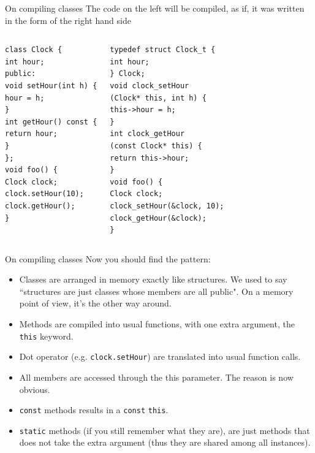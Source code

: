 \begin{frame}[fragile]{On compiling classes}
The code on the left will be compiled, as if, it was written in the form of the right hand side

\begin{columns}

\vspace{-.2in}
\begin{verbatim}
class Clock {
int hour;
public:
void setHour(int h) {
hour = h;
}
int getHour() const {
return hour;
}
};
void foo() {
Clock clock; 
clock.setHour(10);
clock.getHour(); 
}
\end{verbatim}

\vspace{-.2in}
\begin{verbatim}
typedef struct Clock_t {
int hour; 
} Clock;
void clock_setHour
(Clock* this, int h) {
this->hour = h;
}
int clock_getHour
(const Clock* this) {
return this->hour;
}
void foo() {
Clock clock; 
clock_setHour(&clock, 10);
clock_getHour(&clock); 
}
\end{verbatim}
\end{columns}
\end{frame}

\begin{frame}{On compiling classes}
Now you should find the pattern:
\begin{itemize}
\item Classes are arranged in memory exactly like structures. We used to say ``structures are just classes whose members are all public". On a memory point of view, it's the other way around.
\item \alert{Methods are compiled into usual functions}, with one extra argument, the \texttt{this} keyword.
\item Dot operator (e.g. \texttt{clock.setHour}) are translated into usual function calls.
\item All members are accessed through the this parameter. The reason is now obvious.
\item \texttt{const} methods results in a \texttt{const} \texttt{this}.
\item \texttt{static} methods (if you still remember what they are), are just methods that does not take the extra argument (thus they are shared among all instances).
\end{itemize}
\end{frame}

